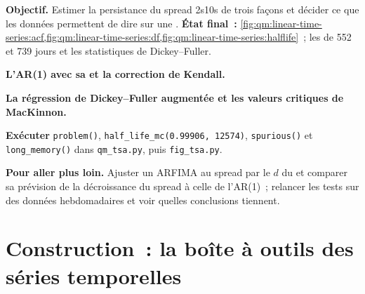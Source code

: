 \begin{tutorial}
\textbf{Objectif.} Estimer la persistance du spread 2s10s de trois façons et décider ce que les données permettent de dire sur une .
\textbf{État final~:} \cref{fig:qm:linear-time-series:acf,fig:qm:linear-time-series:df,fig:qm:linear-time-series:halflife}~; les  de 552 et 739 jours et les
statistiques de Dickey--Fuller.
\begin{tutsteps}
\item \textbf{L'AR(1) avec sa  et la correction de Kendall.}
\label{lst:qm:linear-time-series:ar1}
\item \textbf{La régression de Dickey--Fuller augmentée et les valeurs critiques de MacKinnon.}
\label{lst:qm:linear-time-series:adf}
\item \textbf{Exécuter} \texttt{problem()}, \texttt{half\_life\_mc(0.99906, 12574)}, \texttt{spurious()} et \texttt{long\_memory()} dans \texttt{qm\_tsa.py}, puis
\texttt{fig\_tsa.py}.
\end{tutsteps}
\textbf{Pour aller plus loin.} Ajuster un ARFIMA au spread par le $d$ du  et comparer sa prévision de la décroissance du spread à celle de l'AR(1)~; relancer les
tests sur des données hebdomadaires et voir quelles conclusions tiennent.
\end{tutorial}

\section{Construction~: la boîte à outils des séries temporelles}\label{bld:qm:linear-time-series:tsa}

